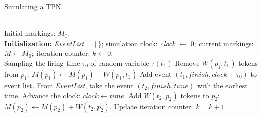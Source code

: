 \documentclass[suppldata]{interact}
\theoremstyle{plain}
\theoremstyle{definition}
\theoremstyle{remark}
\begin{document}
\begin{algorithm}
	\caption{Simulating a TPN.}
	\begin{algorithmic}[1]
		\label{chtp6:Algo:SimulatePetriNet}
		\REQUIRE ~~ \\
		Initial markings: $M_0$. \\
		
		\STATE \textbf{Initialization:}
		\STATE \textit{EventList} = \{\}; simulation clock: \textit{clock} $\leftarrow$ 0; current markings: $M\leftarrow M_0$;
		\STATE iteration counter: $k\leftarrow0$.\\
		
		\STATE Sampling the firing time $\tau_0$ of random variable $\tau(t_1)$
		\STATE Remove $W(p_1,t_1)$ tokens from $p_1$: $M(p_1) \leftarrow M(p_1)-W(p_1,t_1)$
		\ENDFOR
		\STATE Add event $(t_1,finish,clock+\tau_0)$ to event list.
		\ENDWHILE
		\ENDFOR
		\STATE From \textit{EventList}, take the event $(t_2,finish,time)$ with the earliest time. 
		\STATE Advance the clock: $clock\leftarrow time$.
		\STATE Add $W(t_2,p_2)$ tokens to $p_2$: $M(p_2) \leftarrow M(p_2)+W(t_2,p_2)$.
		\ENDFOR		
		\STATE Update iteration counter: $k = k+1$
		\ENDWHILE		
	\end{algorithmic}
\end{algorithm}
\end{document}
